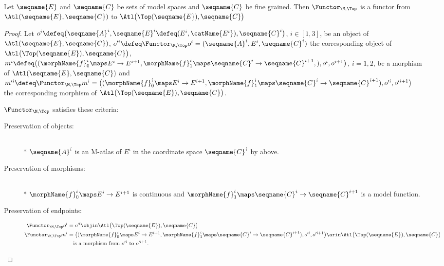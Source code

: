 \documentclass{article}
\begin{document}
\begin{theorem}
\label{the:Func-M-Top}
Let $\seqname{E}$ and $\seqname{C}$ be sets of model spaces and
$\seqname{C}$ be fine grained. Then $\Functor_{\M,\Top}$ is a functor
from $\Atl(\seqname{E}, \seqname{C})$ to
$\Atl \bigl ( \Top(\seqname{E}), \seqname{C} \bigr )$

\begin{proof}
Let
$
  o^i \defeq
  \bigl (
    \seqname{A}^i, \seqname{E}^i \defeq (E^i,\catName{E^i}), \seqname{C}^i
  \bigr )
$,
$i \in [1,3]$, be an object of $\Atl(\seqname{E}, \seqname{C})$,
$
  o'^i \defeq \Functor_{\M,\Top} o^i =
  (\seqname{A}^i, E^i, \seqname{C}^i)
$
the corresponding object of $\Atl \bigl ( \Top(\seqname{E}), \seqname{C} \bigr )$,
$
  m^i \defeq \\*
  \bigl (
    (
      \morphName{f}_0^i \maps E^i \to E^{i+1},
      \morphName{f}_1^i \maps \seqname{C}^i \to \seqname{C}^{i+1},
    ),
    o^i,
    o^{i+1}
  \bigr )
$, $i=1,2$,
be a morphism of $\Atl(\seqname{E}, \seqname{C})$
and
$
  m'^i \defeq \Functor_{\M,\Top} m^i =
  \bigl (
    (
      \morphName{f}_0^i \maps E^i \to E^{i+1},
      \morphName{f}_1^i \maps \seqname{C}^i \to \seqname{C}^{i+1}
    ),
    o'^i,
    o'^{i+1}
  \bigr )
$
the corresponding morphism of $\Atl \bigl ( \Top(\seqname{E}), \seqname{C} \bigr )$.

$\Functor_{\M,\Top}$ satisfies these criteria:
\begin{description}
\item[Preservation of objects:]
\leavevmode \\*
$\seqname{A}^i$ is an M-atlas of $E^i$ in the coordinate space
$\seqname{C}^i$ by  above.

\item[Preservation of morphisms:]
\leavevmode \\*
$\morphName{f}_0^i \maps E^i \to E^{i+1}$ is continuous and
$\morphName{f}_1^i \maps \seqname{C}^i \to \seqname{C}^{i+1}$ is a model
function.

\item[Preservation of endpoints:]
\begin{align*}
  \Functor_{\M,\Top} o^i
  & =
  o'^i \objin \Atl \bigl ( \Top(\seqname{E}), \seqname{C} \bigr )
\\*
  \Functor_{\M,\Top} m^i
  & =
  \bigl (
    (
      \morphName{f}_0^i \maps E^i \to E^{i+1},
      \morphName{f}_1^i \maps \seqname{C}^i \to \seqname{C}^{i+1}
    ),
    o'^i,
    o'^{i+1}
  \bigr )
  \arin \Atl \bigl ( \Top(\seqname{E}), \seqname{C} \bigr )
\\*
  & \quad
\text{is a morphism from $o'^i$ to $o'^{i+1}$.}
\end{align*}


\end{description}
\end{proof}
\end{theorem}
\end{document}
